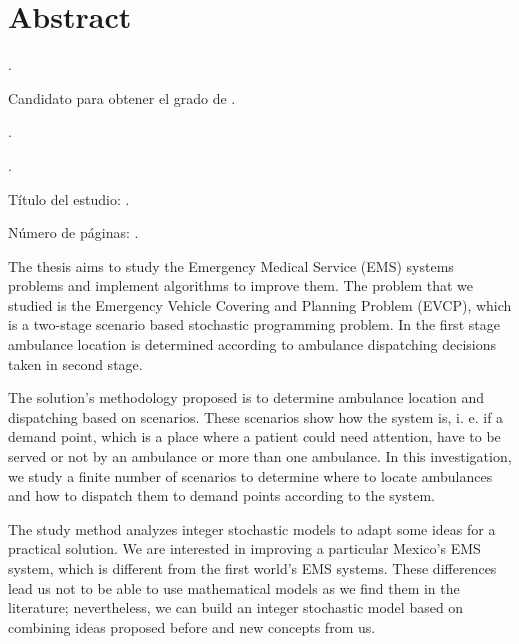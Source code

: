 
\chapter{Abstract}

{\setlength{\leftskip}{10mm}
\setlength{\parindent}{-10mm}

\autor.

Candidato para obtener el grado de \grado\orientacion.

\uanl.

\fime.

Título del estudio: \textsc{\titulo}.

\noindent Número de páginas: \pageref*{lastpage}.}




The thesis aims to study the Emergency Medical Service (EMS) systems pro\-blems and implement algorithms to improve them. The problem that we studied is the Emergency Vehicle Covering and Planning Problem (EVCP), which is a two-stage scenario based stochastic programming problem. In the first stage ambulance location is determined according to ambulance dispatching decisions taken in second stage.

The solution's methodology proposed is to determine ambulance location and dispatching based on scenarios. These scenarios show how the system is, i. e. if a demand point, which is a place where a patient could need attention, have to be served or not by an ambulance or more than one ambulance. In this investigation, we study a finite number of scenarios to determine where to locate ambulances and how to dispatch them to demand points according to the system.

The study method analyzes integer stochastic models to adapt some ideas for a practical solution. We are interested in improving a particular Mexico's EMS system, which is different from the first world's EMS systems. These differences lead us not to be able to use mathematical models as we find them in the literature; nevertheless, we can build an integer stochastic model based on combining ideas proposed before and new concepts from us. 

